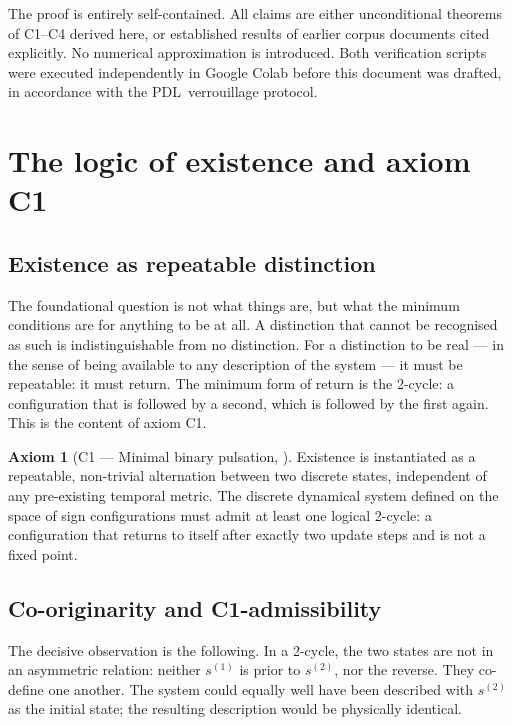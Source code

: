 \documentclass[11pt,a4paper]{article}
\def\PDL{PDL}%
\def\textsc#1{#1}%
\theoremstyle{plain}
\theoremstyle{definition}
\newtheorem{axiom}{Axiom}
\theoremstyle{remark}
\newcommand{\PDL}{\textsc{PDL}}
\begin{document}
The proof is entirely self-contained. All claims are either unconditional theorems of C1--C4
derived here, or established results of earlier corpus documents cited explicitly. No
numerical approximation is introduced. Both verification scripts were executed independently
in Google Colab before this document was drafted, in accordance with the \PDL\ verrouillage
protocol.

\section{The logic of existence and axiom C1}
\label{sec:logic}

\subsection{Existence as repeatable distinction}

The foundational question is not what things are, but what the minimum conditions are for
anything to be at all. A distinction that cannot be recognised as such is indistinguishable
from no distinction. For a distinction to be real --- in the sense of being available to
any description of the system --- it must be repeatable: it must return. The minimum form
of return is the 2-cycle: a configuration that is followed by a second, which is followed
by the first again. This is the content of axiom C1.

\begin{axiom}[C1 --- Minimal binary pulsation, \cite{PDL_D01}]
Existence is instantiated as a repeatable, non-trivial alternation between two discrete
states, independent of any pre-existing temporal metric. The discrete dynamical system
defined on the space of sign configurations must admit at least one logical 2-cycle: a
configuration that returns to itself after exactly two update steps and is not a fixed point.
\end{axiom}

\subsection{Co-originarity and C1-admissibility}

The decisive observation is the following. In a 2-cycle, the two states are not in an
asymmetric relation: neither $s^{(1)}$ is prior to $s^{(2)}$, nor the reverse. They
co-define one another. The system could equally well have been described with $s^{(2)}$
as the initial state; the resulting description would be physically identical.
\end{document}
